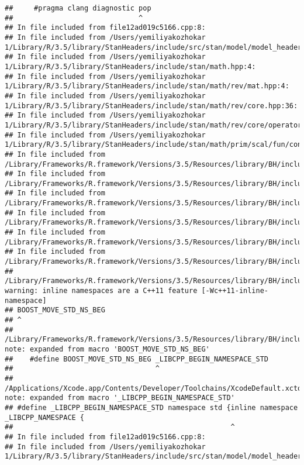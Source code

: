 \documentclass[]{article}
\begin{document}
\begin{verbatim}
##     #pragma clang diagnostic pop
##                              ^
## In file included from file12ad019c5166.cpp:8:
## In file included from /Users/yemiliyakozhokar 1/Library/R/3.5/library/StanHeaders/include/src/stan/model/model_header.hpp:4:
## In file included from /Users/yemiliyakozhokar 1/Library/R/3.5/library/StanHeaders/include/stan/math.hpp:4:
## In file included from /Users/yemiliyakozhokar 1/Library/R/3.5/library/StanHeaders/include/stan/math/rev/mat.hpp:4:
## In file included from /Users/yemiliyakozhokar 1/Library/R/3.5/library/StanHeaders/include/stan/math/rev/core.hpp:36:
## In file included from /Users/yemiliyakozhokar 1/Library/R/3.5/library/StanHeaders/include/stan/math/rev/core/operator_unary_plus.hpp:7:
## In file included from /Users/yemiliyakozhokar 1/Library/R/3.5/library/StanHeaders/include/stan/math/prim/scal/fun/constants.hpp:4:
## In file included from /Library/Frameworks/R.framework/Versions/3.5/Resources/library/BH/include/boost/math/constants/constants.hpp:13:
## In file included from /Library/Frameworks/R.framework/Versions/3.5/Resources/library/BH/include/boost/math/tools/convert_from_string.hpp:15:
## In file included from /Library/Frameworks/R.framework/Versions/3.5/Resources/library/BH/include/boost/lexical_cast.hpp:32:
## In file included from /Library/Frameworks/R.framework/Versions/3.5/Resources/library/BH/include/boost/lexical_cast/try_lexical_convert.hpp:42:
## In file included from /Library/Frameworks/R.framework/Versions/3.5/Resources/library/BH/include/boost/lexical_cast/detail/converter_lexical.hpp:52:
## In file included from /Library/Frameworks/R.framework/Versions/3.5/Resources/library/BH/include/boost/container/container_fwd.hpp:61:
## /Library/Frameworks/R.framework/Versions/3.5/Resources/library/BH/include/boost/container/detail/std_fwd.hpp:27:1: warning: inline namespaces are a C++11 feature [-Wc++11-inline-namespace]
## BOOST_MOVE_STD_NS_BEG
## ^
## /Library/Frameworks/R.framework/Versions/3.5/Resources/library/BH/include/boost/move/detail/std_ns_begin.hpp:18:34: note: expanded from macro 'BOOST_MOVE_STD_NS_BEG'
##    #define BOOST_MOVE_STD_NS_BEG _LIBCPP_BEGIN_NAMESPACE_STD
##                                  ^
## /Applications/Xcode.app/Contents/Developer/Toolchains/XcodeDefault.xctoolchain/usr/include/c++/v1/__config:390:52: note: expanded from macro '_LIBCPP_BEGIN_NAMESPACE_STD'
## #define _LIBCPP_BEGIN_NAMESPACE_STD namespace std {inline namespace _LIBCPP_NAMESPACE {
##                                                    ^
## In file included from file12ad019c5166.cpp:8:
## In file included from /Users/yemiliyakozhokar 1/Library/R/3.5/library/StanHeaders/include/src/stan/model/model_header.hpp:4:

\end{verbatim}
\end{document}

